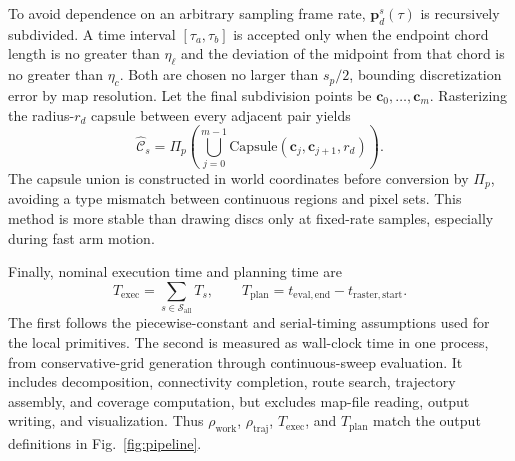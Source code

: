 To avoid dependence on an arbitrary sampling frame rate, $\mathbf p_d^s(\tau)$ is recursively subdivided. A time interval $[\tau_a,\tau_b]$ is accepted only when the endpoint chord length is no greater than $\eta_\ell$ and the deviation of the midpoint from that chord is no greater than $\eta_c$. Both are chosen no larger than $s_p/2$, bounding discretization error by map resolution. Let the final subdivision points be $\mathbf c_0,\ldots,\mathbf c_m$. Rasterizing the radius-$r_d$ capsule between every adjacent pair yields
\begin{equation}
\widehat{\mathcal C}_s=\Pi_p\!\left(\bigcup_{j=0}^{m-1}\mathrm{Capsule}(\mathbf c_j,\mathbf c_{j+1},r_d)\right).
\tag{27}
\label{eq:rasterized-sweep}
\end{equation}
The capsule union is constructed in world coordinates before conversion by $\Pi_p$, avoiding a type mismatch between continuous regions and pixel sets. This method is more stable than drawing discs only at fixed-rate samples, especially during fast arm motion.

Finally, nominal execution time and planning time are
\begin{equation}
T_{\mathrm{exec}}=\sum_{s\in\mathcal S_{\mathrm{all}}}T_s,
\qquad
T_{\mathrm{plan}}=t_{\mathrm{eval,end}}-t_{\mathrm{raster,start}}.
\tag{28}
\label{eq:timing-measures}
\end{equation}
The first follows the piecewise-constant and serial-timing assumptions used for the local primitives. The second is measured as wall-clock time in one process, from conservative-grid generation through continuous-sweep evaluation. It includes decomposition, connectivity completion, route search, trajectory assembly, and coverage computation, but excludes map-file reading, output writing, and visualization. Thus $\rho_{\mathrm{work}}$, $\rho_{\mathrm{traj}}$, $T_{\mathrm{exec}}$, and $T_{\mathrm{plan}}$ match the output definitions in Fig.~\ref{fig:pipeline}.
